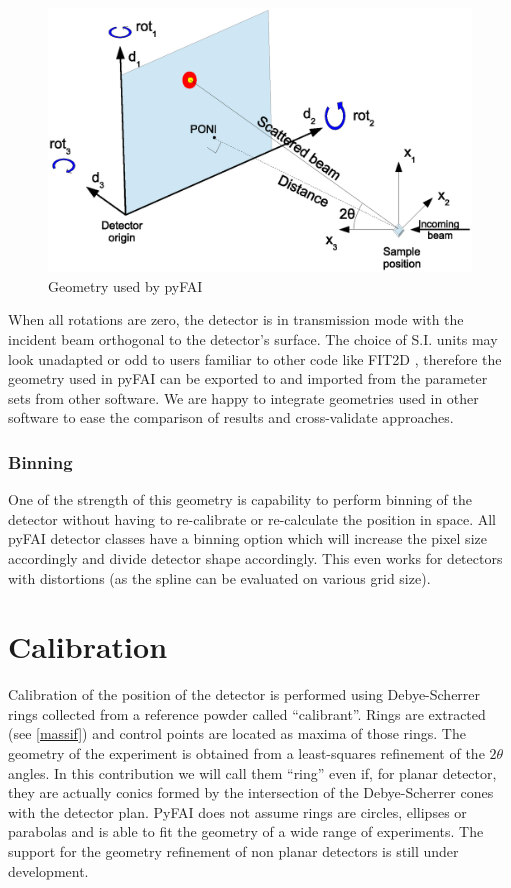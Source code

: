 \documentclass[preprint]{iucr}
\begin{document}
\begin{figure}
\label{PONI}
\begin{center}
\includegraphics[width=15cm]{PONI.eps}
\caption{Geometry used by pyFAI}
\end{center}
\end{figure}

When all rotations are zero, the detector is in transmission mode with the
incident beam orthogonal to the detector's surface.
The choice of S.I. units may look unadapted or odd to users familiar to
other code like FIT2D \cite{fit2d}, therefore the geometry used in pyFAI can be
exported to and imported from the parameter sets from other software.
We are happy to integrate geometries used in other software to ease the
comparison of results and cross-validate approaches.

\subsubsection{Binning}
One of the strength of this geometry is capability to perform binning of the
detector without having to re-calibrate or re-calculate the position in space.
All pyFAI detector classes have a binning option which will increase the pixel
size accordingly and divide detector shape accordingly.
This even works for detectors with distortions (as the spline can be
evaluated on various grid size).

\section{Calibration}
Calibration of the position of the detector is performed using Debye-Scherrer
rings collected from a reference powder called ``calibrant''.
Rings are extracted (see \ref{massif}) and control points are located as maxima
of those rings.
The geometry of the experiment is obtained from a least-squares refinement of
the $2\theta$ angles.
In this contribution we will call them ``ring'' even if, for planar detector,
they are actually conics formed by the intersection of the Debye-Scherrer cones
with the detector plan.
PyFAI does not assume rings are circles, ellipses or parabolas and is able to
fit the geometry of a wide range of experiments.
The support for the geometry refinement of non planar detectors is still under
development.
\end{document}
